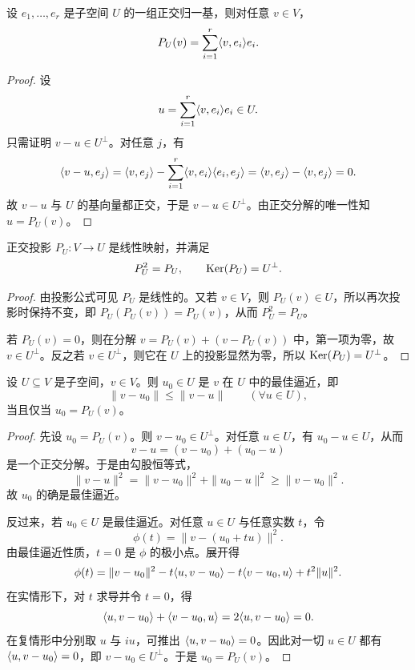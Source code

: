 \begin{theorem}[投影公式]
设 $e_1,\dots,e_r$ 是子空间 $U$ 的一组正交归一基，则对任意 $v\in V$，
\[
P_U(v)=\sum_{i=1}^r \langle v, e_i \rangle e_i.
\]
\end{theorem}

\begin{proof}
设
\[
u=\sum_{i=1}^r \langle v, e_i \rangle e_i\in U.
\]
只需证明 $v-u\in U^{\perp}$。对任意 $j$，有
\[
\langle v-u, e_j \rangle=\langle v, e_j \rangle-\sum_{i=1}^r \langle v, e_i \rangle\langle e_i, e_j \rangle=\langle v, e_j \rangle-\langle v, e_j \rangle=0.
\]
故 $v-u$ 与 $U$ 的基向量都正交，于是 $v-u\in U^{\perp}$。由正交分解的唯一性知 $u=P_U(v)$。
\end{proof}

\begin{proposition}
正交投影 $P_U:V\to U$ 是线性映射，并满足
\[
P_U^2=P_U,\qquad \mathrm{Ker}(P_U)=U^{\perp}.
\]
\end{proposition}

\begin{proof}
由投影公式可见 $P_U$ 是线性的。又若 $v\in V$，则 $P_U(v)\in U$，所以再次投影时保持不变，即 $P_U(P_U(v))=P_U(v)$，从而 $P_U^2=P_U$。

若 $P_U(v)=0$，则在分解 $v=P_U(v)+(v-P_U(v))$ 中，第一项为零，故 $v\in U^{\perp}$。反之若 $v\in U^{\perp}$，则它在 $U$ 上的投影显然为零，所以 $\mathrm{Ker}(P_U)=U^{\perp}$。
\end{proof}

\begin{theorem}[最佳逼近定理]
设 $U\subseteq V$ 是子空间，$v\in V$。则 $u_0\in U$ 是 $v$ 在 $U$ 中的最佳逼近，即
\[
\|v-u_0\|\le \|v-u\|\qquad (\forall u\in U),
\]
当且仅当 $u_0=P_U(v)$。
\end{theorem}

\begin{proof}
先设 $u_0=P_U(v)$。则 $v-u_0\in U^{\perp}$。对任意 $u\in U$，有 $u_0-u\in U$，从而
\[
v-u=(v-u_0)+(u_0-u)
\]
是一个正交分解。于是由勾股恒等式，
\[
\|v-u\|^2=\|v-u_0\|^2+\|u_0-u\|^2\ge \|v-u_0\|^2.
\]
故 $u_0$ 的确是最佳逼近。

反过来，若 $u_0\in U$ 是最佳逼近。对任意 $u\in U$ 与任意实数 $t$，令
\[
\phi(t)=\|v-(u_0+tu)\|^2.
\]
由最佳逼近性质，$t=0$ 是 $\phi$ 的极小点。展开得
\[
\phi(t)=\|v-u_0\|^2-t\langle u, v-u_0 \rangle-t\langle v-u_0, u \rangle+t^2\|u\|^2.
\]
在实情形下，对 $t$ 求导并令 $t=0$，得
\[
\langle u, v-u_0 \rangle+\langle v-u_0, u \rangle=2\langle u, v-u_0 \rangle=0.
\]
在复情形中分别取 $u$ 与 $iu$，可推出 $\langle u, v-u_0 \rangle=0$。因此对一切 $u\in U$ 都有 $\langle u, v-u_0 \rangle=0$，即 $v-u_0\in U^{\perp}$。于是 $u_0=P_U(v)$。
\end{proof}

